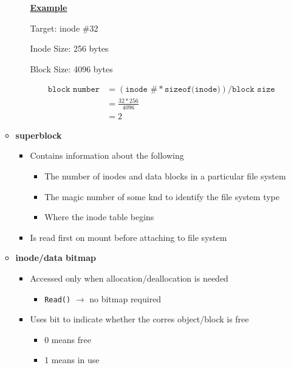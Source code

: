 \documentclass[12pt]{article}
\begin{document}
\begin{enumerate}[1.]
\begin{itemize}
\begin{itemize}
            \bigskip

            \underline{\textbf{Example}}

            \bigskip

            Target: inode \#32

            Inode Size: 256 bytes

            Block Size: 4096 bytes

            \bigskip

            \begin{align}
            \texttt{block number} &= (\texttt{inode \#} * \texttt{sizeof(inode)}) / \texttt{block size}\\
            &= \frac{32 * 256}{4096}\\
            &= 2
            \end{align}


        \end{itemize}
        \item \textbf{superblock}
        \begin{itemize}
            \item Contains information about the following
            \begin{itemize}
                \item The number of inodes and data blocks in a particular file system
                \item The magic number of some knd to identify the file system type
                \item Where the inode table begins
            \end{itemize}
            \item Is read first on mount before attaching to file system
        \end{itemize}
        \item \textbf{inode/data bitmap}
        \begin{itemize}
            \item Accessed only when allocation/deallocation is needed
            \begin{itemize}
                \item \texttt{Read()} $\to$ no bitmap required
            \end{itemize}
            \item Uses bit to indicate whether the corres object/block is free
            \begin{itemize}
                \item 0 means free
                \item 1 means in use
            \end{itemize}
        \end{itemize}


\end{itemize}
\end{enumerate}
\end{document}
